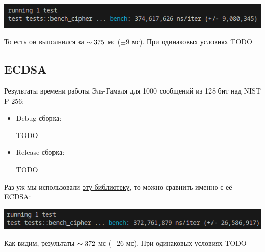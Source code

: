 \begin{center}
  \includegraphics{images/outsource_elgamal.png}
\end{center}

То есть он выполнился за $\thicksim 375$ мс ($\pm9$ мс). При одинаковых условиях TODO

\subsection{ECDSA}
Результаты времени работы Эль-Гамаля для 1000 сообщений из 128 бит над NIST P-256:
\begin{itemize}
  \item Debug сборка:

    TODO

  \item Release сборка:

    TODO
\end{itemize}

Раз уж мы использовали \href{https://github.com/RustCrypto/elliptic-curves/tree/master/p256}{эту библиотеку}, то можно сравнить именно с её ECDSA:

\begin{center}
  \includegraphics{images/outsoucre_ecdsa.png}
\end{center}

Как видим, результаты $\thicksim 372$ мс ($\pm26$ мс). При одинаковых условиях TODO

